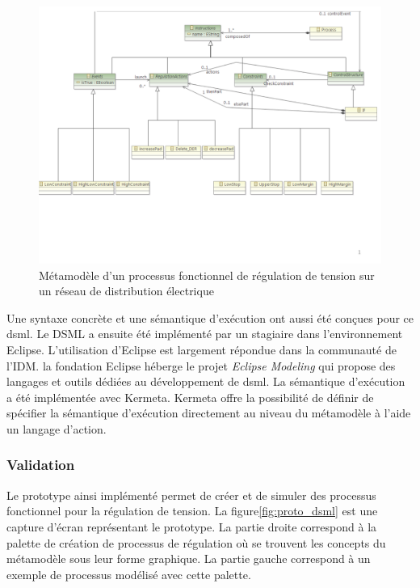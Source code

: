 \begin{figure}[!ht]
 \begin{center}
  \includegraphics[trim = 0cm 3cm 0cm 0cm, width=1\textwidth]{figures/6_methodologie/metamodele_dsml.pdf}
 \end{center}
 \caption{Métamodèle d'un processus fonctionnel de régulation de tension sur un réseau de distribution électrique}
 \label{fig:meta_dsml}
\end{figure} 

Une syntaxe concrète et une sémantique d'exécution ont aussi été conçues pour ce \gls{dsml}. Le DSML a ensuite été implémenté par un stagiaire dans l'environnement Eclipse. L'utilisation d'Eclipse est largement répondue dans la communauté de l'IDM. la fondation Eclipse héberge le projet \textit{Eclipse Modeling }qui propose des langages et outils dédiées au développement de \gls{dsml}. La sémantique d'exécution a été implémentée avec Kermeta. Kermeta offre la possibilité de définir de spécifier la sémantique d'exécution directement au niveau du métamodèle à l'aide un langage d'action. 

		
			\subsubsection{Validation}
Le prototype ainsi implémenté permet de créer et de simuler des processus fonctionnel pour la régulation de tension. La figure\ref{fig:proto_dsml} est une capture d'écran représentant le prototype. La partie droite correspond à la palette de création de processus de régulation où se trouvent les concepts du métamodèle sous leur forme graphique. La partie gauche correspond à un exemple de processus modélisé avec cette palette. 

